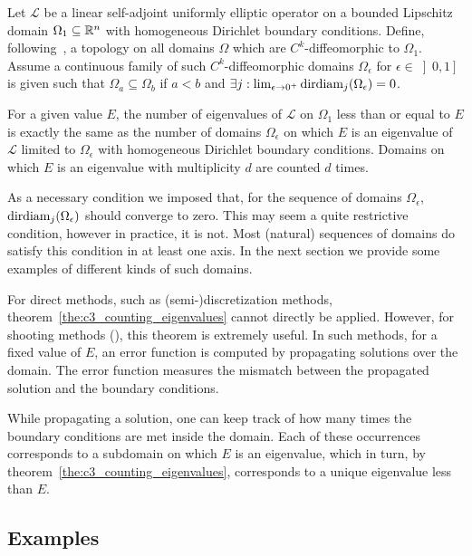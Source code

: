 \begin{theorem}\label{the:c3_counting_eigenvalues}
  Let $\mathcal{L}$ be a linear self-adjoint uniformly elliptic operator on a bounded Lipschitz domain $\Omega_1 \subseteq \mathbb{R}^n$ with homogeneous Dirichlet boundary conditions. Define, following~\cite{hale_eigenvalues_2005}, a topology on all domains $\Omega$ which are $C^k$-diffeomorphic to $\Omega_1$.  Assume a continuous family of such $C^k$-diffeomorphic domains $\Omega_\epsilon$ for $\epsilon\in\left]0, 1\right]$ is given such that $\Omega_a \subseteq \Omega_b$ if $a < b$ and $\exists j : \lim_{\epsilon\to 0^+} \operatorname{dirdiam}_j(\Omega_\epsilon) = 0$.

  For a given value $E$, the number of eigenvalues of $\mathcal{L}$ on $\Omega_1$ less than or equal to $E$ is exactly the same as the number of domains $\Omega_\epsilon$ on which $E$ is an eigenvalue of $\mathcal{L}$ limited to $\Omega_\epsilon$ with homogeneous Dirichlet boundary conditions. Domains on which $E$ is an eigenvalue with multiplicity $d$ are counted $d$ times.
\end{theorem}

As a necessary condition we imposed that, for the sequence of domains $\Omega_\epsilon$, $\operatorname{dirdiam}_j(\Omega_\epsilon)$ should converge to zero. This may seem a quite restrictive condition, however in practice, it is not. Most (natural) sequences of domains do satisfy this condition in at least one axis. In the next section we provide some examples of different kinds of such domains.

For direct methods, such as (semi-)discretization methods, theorem~\ref{the:c3_counting_eigenvalues} cannot directly be applied. However, for shooting methods (\cite{ixaru_new_2010,baeyens_improvements_2022}), this theorem is extremely useful. In such methods, for a fixed value of $E$, an error function is computed by propagating solutions over the domain. The error function measures the mismatch between the propagated solution and the boundary conditions.

While propagating a solution, one can keep track of how many times the boundary conditions are met inside the domain. Each of these occurrences corresponds to a subdomain on which $E$ is an eigenvalue, which in turn, by theorem~\ref{the:c3_counting_eigenvalues}, corresponds to a unique eigenvalue less than $E$.


\subsection{Examples}\label{sec:c3_counting_examples}

